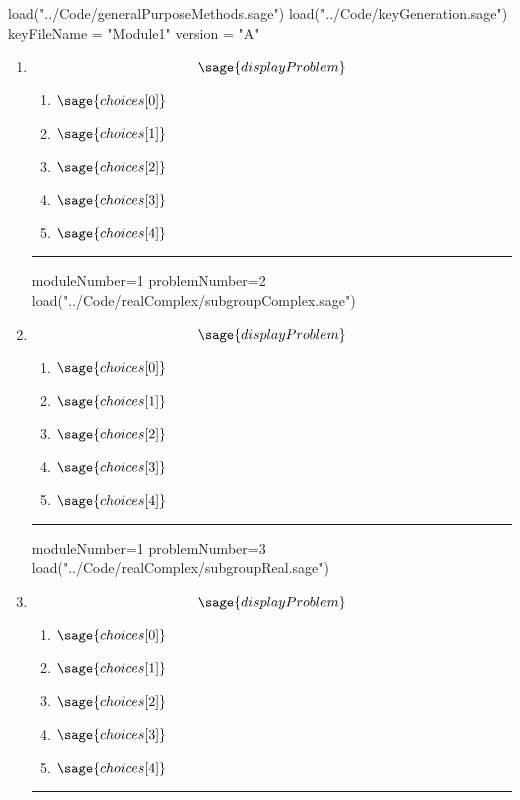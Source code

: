 \documentclass[14pt]{article}
\newcommand{\litem}[1]{\item#1\hspace*{-1cm}\rule{\textwidth}{0.4pt}}
\begin{document}
\pagestyle{fancy}

\begin{sagesilent}
load("../Code/generalPurposeMethods.sage")
load("../Code/keyGeneration.sage")
keyFileName = "Module1"
version = "A"
\end{sagesilent}

\begin{enumerate}
\setcounter{enumi}{0}


\begin{sagesilent}
moduleNumber=1
problemNumber=1
load("../Code/realComplex/divideComplex.sage")
\end{sagesilent}

\litem{ 

	\[ \sage{displayProblem} \]

	\begin{enumerate}[label=\Alph*.]
    \item \( \sage{choices[0]} \)
    \item \( \sage{choices[1]} \)
    \item \( \sage{choices[2]} \)
    \item \( \sage{choices[3]} \)
    \item \( \sage{choices[4]} \)
	\end{enumerate}
}

\begin{sagesilent}
moduleNumber=1
problemNumber=2
load("../Code/realComplex/subgroupComplex.sage")
\end{sagesilent}
\litem{ 

\[ \sage{displayProblem} \]

	\begin{enumerate}[label=\Alph*.]
    \item \( \sage{choices[0]} \)
    \item \( \sage{choices[1]} \)
    \item \( \sage{choices[2]} \)
    \item \( \sage{choices[3]} \)
    \item \( \sage{choices[4]} \)
	\end{enumerate} }

\begin{sagesilent}
moduleNumber=1
problemNumber=3
load("../Code/realComplex/subgroupReal.sage")
\end{sagesilent}
\litem{ 
\[ \sage{displayProblem} \]

	\begin{enumerate}[label=\Alph*.]
    \item \( \sage{choices[0]} \)
    \item \( \sage{choices[1]} \)
    \item \( \sage{choices[2]} \)
    \item \( \sage{choices[3]} \)
    \item \( \sage{choices[4]} \)
	\end{enumerate} }



\end{enumerate}
\end{document}

